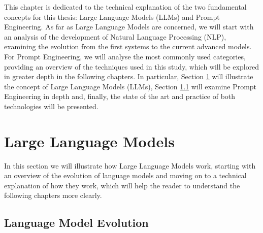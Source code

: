 This chapter is dedicated to the technical explanation of the two fundamental concepts for this thesis: Large Language Models (LLMs) and Prompt Engineering. As far as Large Language Models are concerned, we will start with an analysis of the development of Natural Language Processing (NLP), examining the evolution from the first systems to the current advanced models.
For Prompt Engineering, we will analyse the most commonly used categories, providing an overview of the techniques used in this study, which will be explored in greater depth in the following chapters.
In particular, Section \ref{sec:LLMs} will illustrate the concept of Large Language Models (LLMs), Section \ref{sec:Evolution} will examine Prompt Engineering in depth and, finally, the state of the art and practice of both technologies will be presented.

\section{Large Language Models}
\label{sec:LLMs}
In this section we will illustrate how Large Language Models work, starting with an overview of the evolution of language models and moving on to a technical explanation of how they work, which will help the reader to understand the following chapters more clearly.
\subsection{Language Model Evolution}
\label{sec:Evolution}

